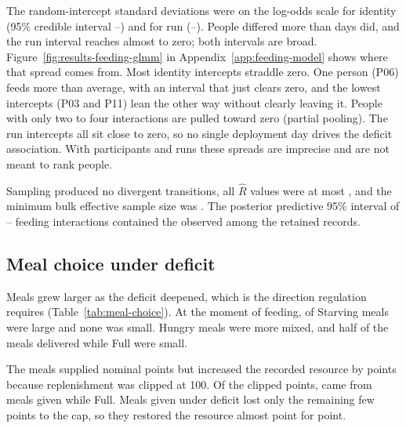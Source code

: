 The random-intercept standard deviations were \CoreModelIdentitySD{} on the log-odds scale for identity (95\% credible interval \CoreModelIdentitySDLow{}--\CoreModelIdentitySDHigh{}) and \CoreModelRunSD{} for run (\CoreModelRunSDLow{}--\CoreModelRunSDHigh{}). People differed more than days did, and the run interval reaches almost to zero; both intervals are broad. Figure~\ref{fig:results-feeding-glmm} in Appendix~\ref{app:feeding-model} shows where that spread comes from. Most identity intercepts straddle zero. One person (P06) feeds more than average, with an interval that just clears zero, and the lowest intercepts (P03 and P11) lean the other way without clearly leaving it. People with only two to four interactions are pulled toward zero (partial pooling). The run intercepts all sit close to zero, so no single deployment day drives the deficit association. With \CoreModelIdentities{} participants and \CoreModelRuns{} runs these spreads are imprecise and are not meant to rank people.

Sampling produced no divergent transitions, all $\hat R$ values were at most \CoreModelMaxRhat{}, and the minimum bulk effective sample size was \CoreModelMinESS{}. The posterior predictive 95\% interval of \CoreModelPPFeedingLow{}--\CoreModelPPFeedingHigh{} feeding interactions contained the \CoreModelObservedFeeding{} observed among the retained records.

\subsection{Meal choice under deficit}

Meals grew larger as the deficit deepened, which is the direction regulation requires (Table~\ref{tab:meal-choice}). At the moment of feeding, \CoreStarvingLargeMeals{} of \CoreStarvingMeals{} Starving meals were large and none was small. Hungry meals were more mixed, and half of the \CoreFullMeals{} meals delivered while Full were small.

The \CoreFeedingEvents{} meals supplied \CoreNominalMealPoints{} nominal points but increased the recorded resource by \CoreAcceptedMealPoints{} points because replenishment was clipped at 100. Of the \CoreClippedPoints{} clipped points, \CoreClippedPointsFull{} came from meals given while Full. Meals given under deficit lost only the remaining few points to the cap, so they restored the resource almost point for point.

